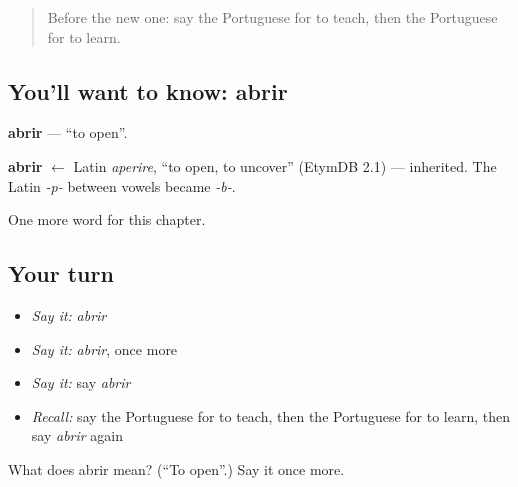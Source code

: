 \begin{quote}
Before the new one: say the Portuguese for to teach, then the Portuguese for to learn.
\end{quote}

\subsection*{You'll want to know: abrir}
\textbf{abrir} — \textquotedblleft{}to open\textquotedblright{}.

\begin{cousinweb}
\textbf{abrir} $\leftarrow$ Latin \emph{aperire}, \textquotedblleft{}to open, to uncover\textquotedblright{} (EtymDB 2.1) — inherited. The Latin \emph{-p-} between vowels became \emph{-b-}.
\end{cousinweb}

\begin{grammarlens}[title={What you've built}]
One more word for this chapter.
\end{grammarlens}

\subsection*{Your turn}
\begin{itemize}
\raggedright
  \item \emph{Say it:} \emph{abrir}
  \item \emph{Say it:} \emph{abrir}, once more
  \item \emph{Say it:} say \emph{abrir}
  \item \emph{Recall:} say the Portuguese for to teach, then the Portuguese for to learn, then say \emph{abrir} again
\end{itemize}

\begin{tcolorbox}[breakable,colback=teal!4,colframe=teal!35!black,title={Before you move on}]
What does abrir mean? (\textquotedblleft{}To open\textquotedblright{}.) Say it once more.
\end{tcolorbox}
